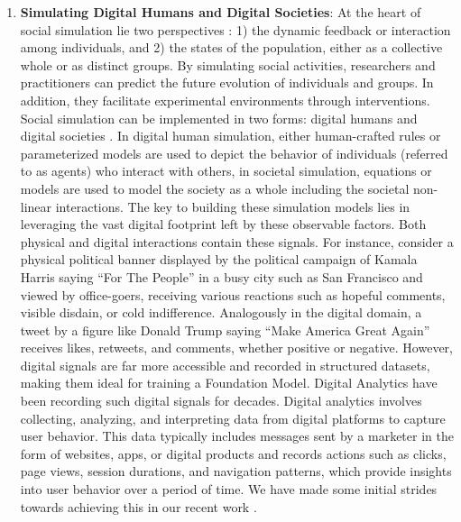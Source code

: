 \begin{enumerate}
    \item \textbf{Simulating Digital Humans and Digital Societies}: At the heart of social simulation lie two perspectives \cite{gilbert2005simulation}: 1) the dynamic feedback or interaction among individuals, and 2) the states of the population, either as a collective whole or as distinct groups. By simulating social activities, researchers and practitioners can predict the future evolution of individuals and groups. In addition, they facilitate experimental environments through interventions. Social simulation can be implemented in two forms: digital humans \cite{park2023generative,chopard1998cellular,Argyle_2023} and digital societies \cite{khandelwal2023large,bhattacharyyasocia2024,si2023long,khurana2023behavior,santurkar2023whose}. In digital human simulation, either human-crafted rules or parameterized models are used to depict the behavior of individuals (referred to as agents) who interact with others, in societal simulation, equations or models are used to model the society as a whole including the societal non-linear interactions. The key to building these simulation models lies in leveraging the vast digital footprint left by these observable factors. Both physical and digital interactions contain these signals. For instance, consider a physical political banner displayed by the political campaign of Kamala Harris saying ``For The People'' in a busy city such as San Francisco and viewed by office-goers, receiving various reactions such as hopeful comments, visible disdain, or cold indifference. Analogously in the digital domain, a tweet by a figure like Donald Trump saying ``Make America Great Again'' receives likes, retweets, and comments, whether positive or negative. However, digital signals are far more accessible and recorded in structured datasets, making them ideal for training a Foundation Model. Digital Analytics have been recording such digital signals for decades. Digital analytics involves collecting, analyzing, and interpreting data from digital platforms to capture user behavior. This data typically includes messages sent by a marketer in the form of websites, apps, or digital products and records actions such as clicks, page views, session durations, and navigation patterns, which provide insights into user behavior over a period of time. We have made some initial strides towards achieving this in our recent work \cite{bhattacharyyasocia2024}.



\end{enumerate}
